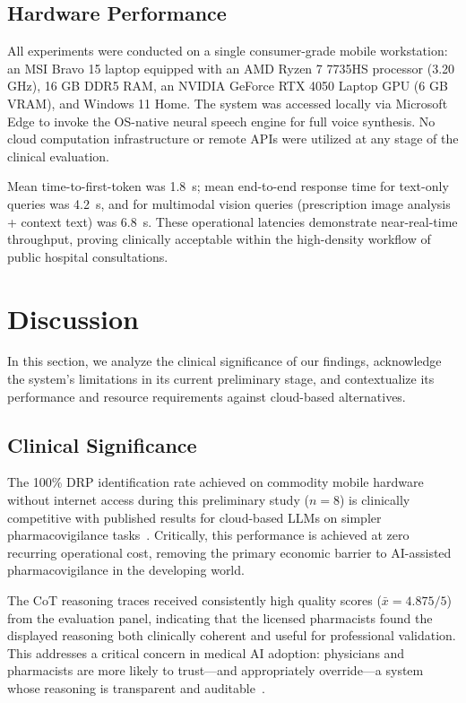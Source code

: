 \documentclass[9pt,conference]{IEEEtran}
\begin{document}
\subsection{Hardware Performance}

All experiments were conducted on a single consumer-grade mobile workstation:
an MSI Bravo 15 laptop equipped with an AMD Ryzen 7 7735HS processor (3.20 GHz),
16 GB DDR5 RAM, an NVIDIA GeForce RTX 4050 Laptop GPU (6 GB VRAM), and
Windows 11 Home. The system was accessed locally via Microsoft Edge to invoke 
the OS-native neural speech engine for full voice synthesis. No cloud 
computation infrastructure or remote APIs were utilized at any stage of 
the clinical evaluation.

Mean time-to-first-token was 1.8~s; mean end-to-end response time for
text-only queries was 4.2~s, and for multimodal vision queries (prescription 
image analysis + context text) was 6.8~s. These operational latencies 
demonstrate near-real-time throughput, proving clinically acceptable 
within the high-density workflow of public hospital consultations.

\section{Discussion}
\label{sec:discussion}

In this section, we analyze the clinical significance of our findings, acknowledge the system's limitations in its current preliminary stage, and contextualize its performance and resource requirements against cloud-based alternatives.

\subsection{Clinical Significance}

The 100\% DRP identification rate achieved on commodity mobile hardware without internet access during this preliminary study ($n=8$) is clinically competitive with published results for cloud-based LLMs on simpler pharmacovigilance tasks~\cite{agrawal2022largelanguagemodelsfewshot}. Critically, this performance is achieved at zero recurring operational cost, removing the primary economic barrier to AI-assisted pharmacovigilance in the developing world.

The CoT reasoning traces received consistently high quality scores ($\bar{x} = 4.875/5$) from the evaluation panel, indicating that the licensed pharmacists found the displayed reasoning both clinically coherent and useful for professional validation. This addresses a critical concern in medical AI adoption: physicians and pharmacists are more likely to trust---and appropriately override---a system whose reasoning is transparent and auditable~\cite{thirunavukarasu2023large}.
\end{document}
